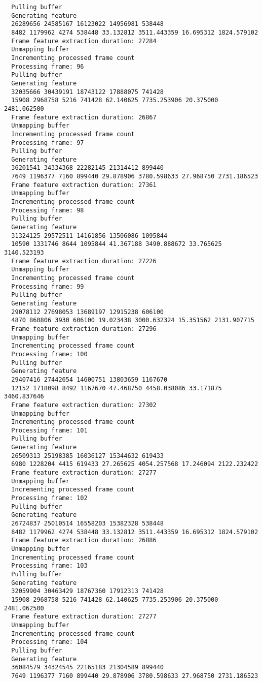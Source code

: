 \documentclass[12pt,oneside]{book}
\begin{document}
\begin{lstlisting}
  Pulling buffer
  Generating feature
  26289656 24585167 16123022 14956981 538448
  8482 1179962 4274 538448 33.132812 3511.443359 16.695312 1824.579102
  Frame feature extraction duration: 27284
  Unmapping buffer
  Incrementing processed frame count
  Processing frame: 96
  Pulling buffer
  Generating feature
  32035666 30439191 18743122 17888075 741428
  15908 2968758 5216 741428 62.140625 7735.253906 20.375000 2481.062500
  Frame feature extraction duration: 26867
  Unmapping buffer
  Incrementing processed frame count
  Processing frame: 97
  Pulling buffer
  Generating feature
  36201541 34334368 22282145 21314412 899440
  7649 1196377 7160 899440 29.878906 3780.598633 27.968750 2731.186523
  Frame feature extraction duration: 27361
  Unmapping buffer
  Incrementing processed frame count
  Processing frame: 98
  Pulling buffer
  Generating feature
  31324125 29572511 14161856 13506086 1095844
  10590 1331746 8644 1095844 41.367188 3490.888672 33.765625 3140.523193
  Frame feature extraction duration: 27226
  Unmapping buffer
  Incrementing processed frame count
  Processing frame: 99
  Pulling buffer
  Generating feature
  29078112 27698053 13689197 12915238 606100
  4870 860806 3930 606100 19.023438 3000.632324 15.351562 2131.907715
  Frame feature extraction duration: 27296
  Unmapping buffer
  Incrementing processed frame count
  Processing frame: 100
  Pulling buffer
  Generating feature
  29407416 27442654 14600751 13803659 1167670
  12152 1718098 8492 1167670 47.468750 4458.038086 33.171875 3460.837646
  Frame feature extraction duration: 27302
  Unmapping buffer
  Incrementing processed frame count
  Processing frame: 101
  Pulling buffer
  Generating feature
  26509313 25198385 16036127 15344632 619433
  6980 1228204 4415 619433 27.265625 4054.257568 17.246094 2122.232422
  Frame feature extraction duration: 27277
  Unmapping buffer
  Incrementing processed frame count
  Processing frame: 102
  Pulling buffer
  Generating feature
  26724837 25010514 16558203 15382328 538448
  8482 1179962 4274 538448 33.132812 3511.443359 16.695312 1824.579102
  Frame feature extraction duration: 26886
  Unmapping buffer
  Incrementing processed frame count
  Processing frame: 103
  Pulling buffer
  Generating feature
  32059904 30463429 18767360 17912313 741428
  15908 2968758 5216 741428 62.140625 7735.253906 20.375000 2481.062500
  Frame feature extraction duration: 27277
  Unmapping buffer
  Incrementing processed frame count
  Processing frame: 104
  Pulling buffer
  Generating feature
  36084579 34324545 22165183 21304589 899440
  7649 1196377 7160 899440 29.878906 3780.598633 27.968750 2731.186523

\end{lstlisting}
\end{document}
